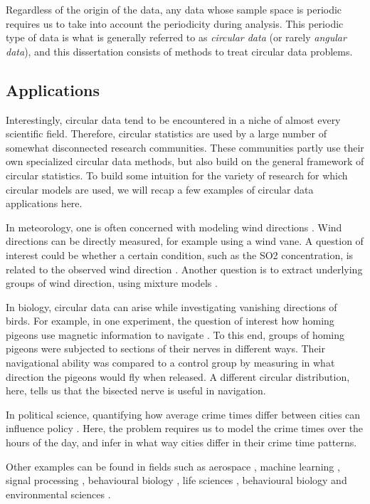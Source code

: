 \documentclass[12pt, a4paper]{book}\usepackage[]{graphicx}\usepackage[]{color}
\begin{document}
Regardless of the origin of the data, any data whose sample space is periodic requires us to  take into account the periodicity during analysis. This periodic type of data is what is generally referred to as \textit{circular data} (or rarely \textit{angular data}), and this dissertation consists of methods to treat circular data problems.

\subsection*{Applications}

Interestingly, circular data tend to be encountered in a niche of almost every scientific field. Therefore, circular statistics are used by a large number of somewhat disconnected research communities. These communities partly use their own specialized circular data methods, but also build on the general framework of circular statistics. To build some intuition for the variety of research for which circular models are used, we will recap a few examples of circular data applications here.

In meteorology, one is often concerned with modeling wind directions \citep{bowers2000directional}. Wind directions can be directly measured, for example using a wind vane. A question of interest could be whether a certain condition, such as the SO2 concentration, is related to the observed wind direction \citep{garcia2013exploring}. Another question is to extract underlying groups of wind direction, using mixture models \citep{masseran2013fitting}.

In biology, circular data can arise while investigating vanishing directions of birds. For example, in one experiment, the question of interest how homing pigeons use magnetic information to navigate \citep{gagliardo2008navigational}. To this end, groups of homing pigeons were subjected to sections of their nerves in different ways. Their navigational ability was compared to a control group by measuring in what direction the pigeons would fly when released. A different circular distribution, here, tells us that the bisected nerve is useful in navigation.

In political science, quantifying how average crime times differ between cities can influence policy \citep{gill2010}. Here, the problem requires us to model the crime times over the hours of the day, and infer in what way cities differ in their crime time patterns.

Other examples can be found in fields such as aerospace \citep{kurz2017deterministic},  machine learning \citep{gopal2014mises}, signal processing \citep{traa2013wrapped}, behavioural biology \citep{nunez2018bayesian}, life sciences \citep{mardianew}, behavioural biology \citep{bulbert2015danger} and environmental sciences \citep{lagona2016regression, lagona2015hidden, arnold2006recent}.
\end{document}
